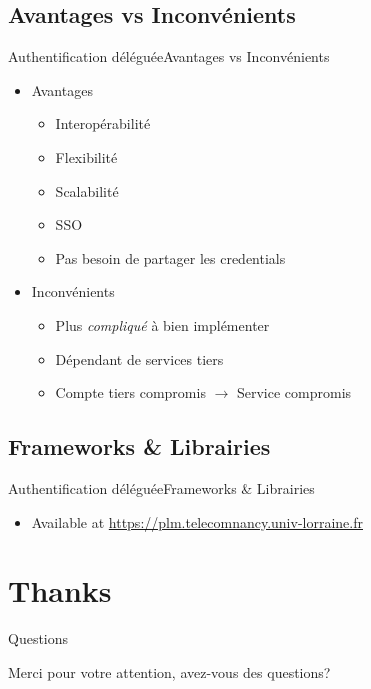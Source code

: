 \documentclass{beamer}
\begin{document}
\subsection{Avantages vs Inconvénients}

\begin{frame}{Authentification déléguée}{Avantages vs Inconvénients}
  \begin{center}
    \begin{itemize}
      \item Avantages
      \begin{itemize}
        \item Interopérabilité
        \item Flexibilité
        \item Scalabilité
        \item SSO
        \item Pas besoin de partager les credentials
      \end{itemize}
      \item Inconvénients
      \begin{itemize}
        \item Plus \emph{compliqué} à bien implémenter
        \item Dépendant de services tiers
        \item Compte tiers compromis $\rightarrow$ Service compromis
      \end{itemize}
    \end{itemize}
  \end{center}
\end{frame}

\subsection{Frameworks \& Librairies}

\begin{frame}{Authentification déléguée}{Frameworks \& Librairies}
  \begin{center}
    \begin{itemize}
    \item Available at \url{https://plm.telecomnancy.univ-lorraine.fr}
    \end{itemize}
  \end{center}
\end{frame}

\section*{Thanks}

\begin{frame}{Questions}
  \begin{center}
    Merci pour votre attention, avez-vous des questions?
  \end{center}
\end{frame}
\end{document}
